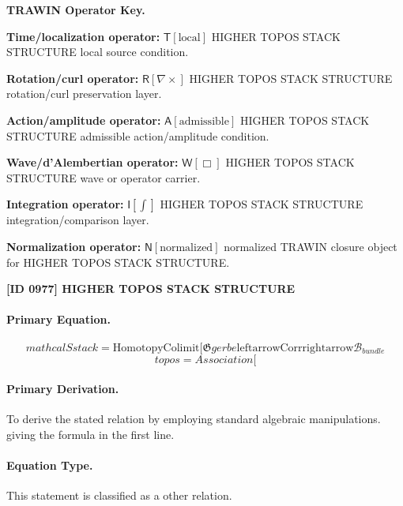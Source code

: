 \par\vspace{0.45\baselineskip}
\noindent\begin{minipage}[t]{\linewidth}
\begingroup
\small
\raggedright
\textbf{TRAWIN Operator Key.}\par
\noindent\textbf{Time/localization operator:} $\mathsf{T}\!\left[\mathrm{local}\right]$ HIGHER TOPOS STACK STRUCTURE local source condition.\par
\noindent\textbf{Rotation/curl operator:} $\mathsf{R}\!\left[\nabla\times\right]$ HIGHER TOPOS STACK STRUCTURE rotation/curl preservation layer.\par
\noindent\textbf{Action/amplitude operator:} $\mathsf{A}\!\left[\mathrm{admissible}\right]$ HIGHER TOPOS STACK STRUCTURE admissible action/amplitude condition.\par
\noindent\textbf{Wave/d'Alembertian operator:} $\mathsf{W}\!\left[\Box\right]$ HIGHER TOPOS STACK STRUCTURE wave or operator carrier.\par
\noindent\textbf{Integration operator:} $\mathsf{I}\!\left[\int\right]$ HIGHER TOPOS STACK STRUCTURE integration/comparison layer.\par
\noindent\textbf{Normalization operator:} $\mathsf{N}\!\left[\mathrm{normalized}\right]$ normalized TRAWIN closure object for HIGHER TOPOS STACK STRUCTURE.\par
\endgroup
\end{minipage}

\clearpage
\noindent\textbf{[ID 0977] HIGHER TOPOS STACK STRUCTURE}\par
\vspace{0.35em}
\paragraph{Primary Equation.}
\[
mathcal{S} {stack} = \text{HomotopyColimit}[\mathfrak{G} {gerbe} \mathrm{leftarrow} \text{Corr} \mathrm{rightarrow} \mathcal{B}_{bundle}
\]
\[
topos = Association[
\]

\paragraph{Primary Derivation.}
To derive the stated relation by employing standard algebraic manipulations. giving the formula in the first line.
\paragraph{Equation Type.}
This statement is classified as a other relation.

